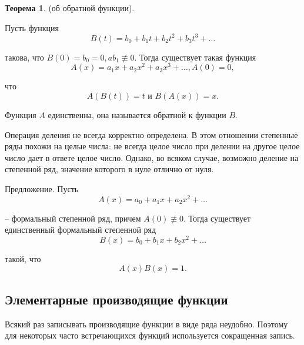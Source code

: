 \documentclass[
russian,
cp1251,
14pt,
simple
]{eskdtext}
\theoremstyle{definition}
\newtheorem{theorem}{\normalfont Теорема}[subsection]
\begin{document}
\begin{theorem}(об обратной функции).
\end{theorem}
Пусть функция
$$
B\left(t\right) = b_0 + b_1 t + b_2 t^2 + b_3 t^3 + \ldots
$$

такова, что $B\left(0\right) = b_0 = 0, a b_1 \not\equiv 0$. Тогда существует такая функция
$$
A\left(x\right) = a_1 x + a_2 x^2 + a_3 x^3 + \ldots, A\left(0\right) = 0,
$$

что
$$
A\left(B\left(t\right)\right) = t  \text{ и } B\left(A\left(x\right)\right) = x.
$$

Функция $A$ единственна, она называется обратной к функции $B$. 

Операция деления не всегда корректно определена. В этом отношении степенные ряды похожи на целые числа: не всегда целое число при делении на другое целое число дает в ответе целое число. Однако, во всяком случае, возможно деление на степенной ряд, значение которого в нуле отлично от нуля.

Предложение. Пусть
$$
A\left(x\right) = a_0 + a_1 x + a_2 x^2 + \ldots
$$
 
– формальный степенной ряд, причем $A\left(0\right) \not\equiv 0$. Тогда существует единственный формальный степенной ряд
$$
B\left(x\right) = b_0 + b_1 x + b_2 x^2 + \ldots
$$

такой, что
$$
A\left(x\right) B\left(x\right) = 1.
$$

\subsection{Элементарные производящие функции}

Всякий раз записывать производящие функции в виде ряда неудобно. Поэтому для некоторых часто встречающихся функций используется сокращенная запись.
\end{document}
